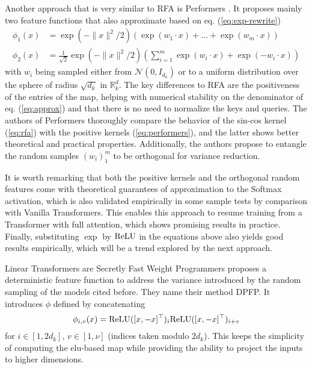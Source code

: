 Another approach that is very similar to RFA is Performers \cite{choromanski2022rethinking}. It proposes mainly two feature functions that also approximate based on eq. (\ref{eq:exp-rewrite})
\begin{equation}
\label{eq:performers}
    \begin{split}
        \phi_1(x)&= \exp(-\|x\|^2/2)(\exp(w_1 \cdot x) + \ldots + \exp(w_m \cdot x)) \\
        \phi_2(x)&= \frac{1}{\sqrt{2}}\exp(-\|x\|^2/2)(\sum_{i=1}^m \exp(w_i \cdot x) + \exp(-w_i \cdot x))
    \end{split}
\end{equation} 
with $w_i$ being sampled either from $\mathcal{N}(0, I_{d_k})$ or to a uniform distribution over the sphere of radius $\sqrt{d_k}$ in $\mathbb{R}^d_k$. The key differences to RFA are the positiveness of the entries of the map, helping with numerical stability on the denominator of eq. (\ref{eq:approx}) and
that there is no need to normalize the keys and queries. The authors of Performers thoroughly compare the behavior of the sin-cos kernel (\ref{eq:rfa}) with the positive kernels (\ref{eq:performers}), and the latter shows better theoretical and practical properties. Additionally, the authors propose to entangle the random samples $(w_i)_1^m$ to be orthogonal for variance reduction. 

It is worth remarking that both the positive kernels and the orthogonal random features come with theoretical guarantees of approximation to the Softmax activation, which is also validated empirically in some sample tests by comparison with Vanilla Transformers. This enables this approach to resume training from a Transformer with full attention, which shows promising results in practice. Finally, substituting $\exp$ by $\text{ReLU}$ in the equations above also yields good results empirically, which will be a trend explored by the next approach.

\vspace{1em}

Linear Transformers are Secretly Fast Weight Programmers \cite{schlag2021linear} proposes a deterministic feature function to address the variance introduced by the random sampling of the models cited before. They name their method DPFP. It introduces $\phi$ defined by concatenating 
\begin{equation}
\label{eq:FWP}\phi_{i, v}(x) = \text{ReLU}([x, -x]^\top)_i \text{ReLU}([x, -x]^\top)_{i + v}
\end{equation} 
for $i \in [1, 2d_k]$, $v \in [1, \nu]$ (indices taken modulo $2d_k$). This keeps the simplicity of computing the elu-based map while providing the ability to project the inputs to higher dimensions.

